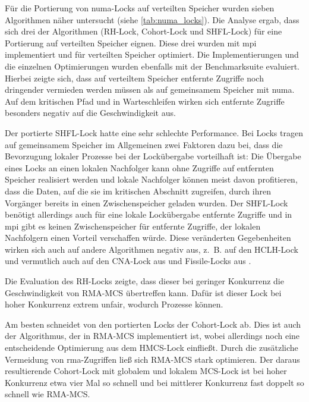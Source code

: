 Für die Portierung von \gls{numa}-Locks auf verteilten Speicher
wurden sieben Algorithmen näher untersucht (siehe \autoref{tab:numa_locks}).
Die Analyse ergab,
dass sich drei der Algorithmen
(RH-Lock, Cohort-Lock und SHFL-Lock)
für eine Portierung auf verteilten Speicher eignen.
Diese drei wurden mit \gls{mpi} implementiert und für verteilten Speicher optimiert.
Die Implementierungen und die einzelnen Optimierungen
wurden ebenfalls mit der Benchmarksuite evaluiert.
Hierbei zeigte sich,
dass auf verteiltem Speicher
entfernte Zugriffe noch dringender vermieden werden müssen
als auf gemeinsamem Speicher mit \gls{numa}.
Auf dem kritischen Pfad und in Warteschleifen
wirken sich entfernte Zugriffe besonders negativ auf die Geschwindigkeit aus.

Der portierte SHFL-Lock hatte eine sehr schlechte Performance.
Bei Locks tragen auf gemeinsamem Speicher im Allgemeinen zwei Faktoren dazu bei,
dass die Bevorzugung lokaler Prozesse bei der Lockübergabe vorteilhaft ist:
Die Übergabe eines Locks an einen lokalen Nachfolger kann ohne Zugriffe auf entfernten Speicher realisiert werden
und lokale Nachfolger können meist davon profitieren,
dass die Daten,
auf die sie im kritischen Abschnitt zugreifen,
durch ihren Vorgänger bereits in einen \gls{Zwischenspeicher} geladen wurden.
Der SHFL-Lock benötigt allerdings auch für eine lokale Lockübergabe entfernte Zugriffe
und in \gls{mpi} gibt es keinen \gls{Zwischenspeicher} für entfernte Zugriffe,
der lokalen Nachfolgern einen Vorteil verschaffen würde.
Diese veränderten Gegebenheiten wirken sich auch auf andere Algorithmen negativ aus,
z.~B. auf den HCLH-Lock und vermutlich auch auf den CNA-Lock aus \cite{CNA-Lock}
und Fissile-Locks aus \cite{Fissile-Locks}.

Die Evaluation des RH-Locks zeigte,
dass dieser bei geringer Konkurrenz die Geschwindigkeit von RMA-MCS übertreffen kann.
Dafür ist dieser Lock bei hoher Konkurrenz extrem unfair,
wodurch Prozesse  können.

Am besten schneidet von den portierten Locks der Cohort-Lock ab.
Dies ist auch der Algorithmus,
der in RMA-MCS implementiert ist,
wobei allerdings noch eine entscheidende Optimierung aus dem HMCS-Lock einfließt.
Durch die zusätzliche Vermeidung von \gls{rma}-Zugriffen
ließ sich RMA-MCS stark optimieren.
Der daraus resultierende Cohort-Lock mit globalem und lokalem MCS-Lock
ist bei hoher Konkurrenz etwa vier Mal so schnell
und bei mittlerer Konkurrenz fast doppelt so schnell wie RMA-MCS.


